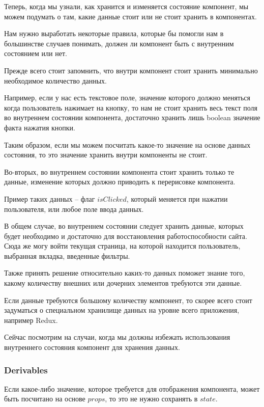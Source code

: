 Теперь, когда мы узнали, как хранится и изменяется состояние компонент, мы можем подумать о там, какие данные стоит или не стоит хранить в компонентах.

Нам нужно выработать некоторые правила, которые бы помогли нам в большинстве случаев понимать, должен ли компонент быть с внутренним состоянием или нет. 

Прежде всего стоит запомнить, что внутри компонент стоит хранить минимально необходимое количество данных.

Например, если у нас есть текстовое поле, значение которого должно меняться когда пользователь нажимает на кнопку, то нам не стоит хранить весь текст поля во внутреннем состоянии компонента, достаточно хранить лишь boolean значение факта нажатия кнопки.

Таким образом, если мы можем посчитать какое-то значение на основе данных состояния, то это значение хранить внутри компоненты не стоит.

Во-вторых, во внутреннем состоянии компонента стоит хранить только те данные, изменение которых должно приводить к перерисовке компонента.

Пример таких данных -- флаг $isClicked$, который меняется при нажатии пользователя, или любое поле ввода данных.

В общем случае, во внутреннем состоянии следует хранить данные, которых будет необходимо и достаточно для восстановления работоспособности сайта. Сюда же могу войти текущая страница, на которой находится пользователь, выбранная вкладка, введенные фильтры.

Также принять решение относительно каких-то данных поможет знание того, какому количеству внешних или дочерних элементов требуются эти данные.

Если данные требуются большому количеству компонент, то скорее всего стоит задуматься о специальном хранилище данных на уровне всего приложения, например Redux.

Сейчас посмотрим на случаи, когда мы должны избежать использования внутреннего состояния компонент для хранения данных.

\subsubsection{Derivables}

Если какое-либо значение, которое требуется для отображения компонента, может быть посчитано на основе $props$, то это не нужно сохранять в $state$.

